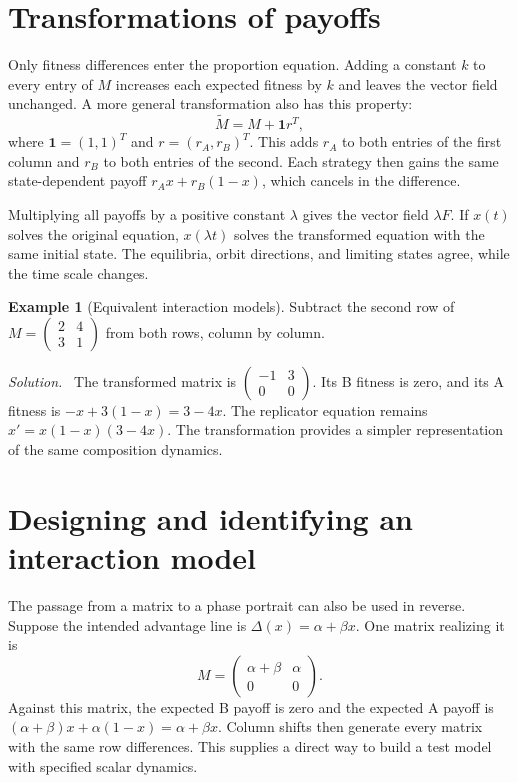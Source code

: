 \documentclass[11pt,oneside,openany]{book}
\theoremstyle{definition}
\newtheorem{example}{Example}[chapter]
\theoremstyle{remark}
\newenvironment{solution}{\par\smallskip\noindent\textit{Solution.}\ }{\par\smallskip}
\newcommand{\ones}{\mathbf{1}}
\numberwithin{equation}{chapter}
\begin{document}
\section{Transformations of payoffs}
Only fitness differences enter the proportion equation. Adding a constant $k$ to every entry of $M$ increases each expected fitness by $k$ and leaves the vector field unchanged. A more general transformation also has this property:
\begin{equation}\label{eq:columnshift}
\widetilde M=M+\ones r^T,
\end{equation}
where $\ones=(1,1)^T$ and $r=(r_A,r_B)^T$. This adds $r_A$ to both entries of the first column and $r_B$ to both entries of the second. Each strategy then gains the same state-dependent payoff $r_Ax+r_B(1-x)$, which cancels in the difference.

Multiplying all payoffs by a positive constant $\lambda$ gives the vector field $\lambda F$. If $x(t)$ solves the original equation, $x(\lambda t)$ solves the transformed equation with the same initial state. The equilibria, orbit directions, and limiting states agree, while the time scale changes.

\begin{example}[Equivalent interaction models]
Subtract the second row of $M=\left(\begin{smallmatrix}2&4\\3&1\end{smallmatrix}\right)$ from both rows, column by column.
\begin{solution}
The transformed matrix is $\left(\begin{smallmatrix}-1&3\\0&0\end{smallmatrix}\right)$. Its B fitness is zero, and its A fitness is $-x+3(1-x)=3-4x$. The replicator equation remains $x'=x(1-x)(3-4x)$. The transformation provides a simpler representation of the same composition dynamics.
\end{solution}
\end{example}

\section{Designing and identifying an interaction model}
The passage from a matrix to a phase portrait can also be used in reverse. Suppose the intended advantage line is $\Delta(x)=\alpha+\beta x$. One matrix realizing it is
\[
M=\begin{pmatrix}\alpha+\beta&\alpha\\0&0\end{pmatrix}.
\]
Against this matrix, the expected B payoff is zero and the expected A payoff is $(\alpha+\beta)x+\alpha(1-x)=\alpha+\beta x$. Column shifts then generate every matrix with the same row differences. This supplies a direct way to build a test model with specified scalar dynamics.
\end{document}
